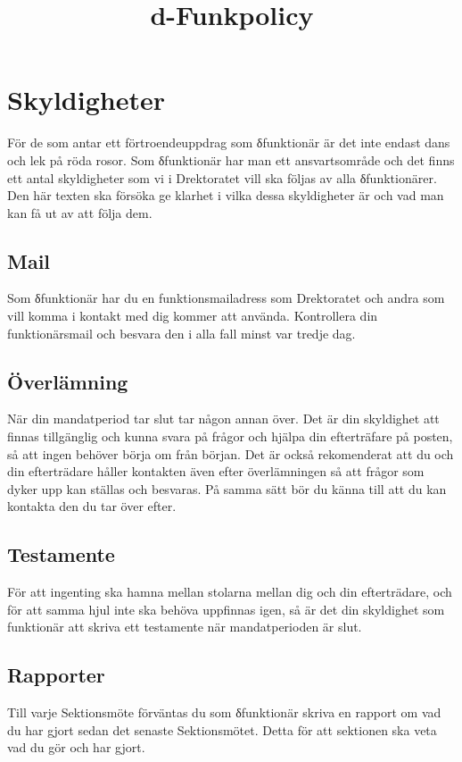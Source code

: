 \documentclass{dgovdoc}
\title{d-Funkpolicy}
\begin{document}
\maketitle

\section*{Skyldigheter}
För de som antar ett förtroendeuppdrag som δfunktionär är det inte endast dans och lek på röda rosor. Som δfunktionär har man ett ansvartsområde och det finns ett antal skyldigheter som vi i D­rektoratet vill ska följas av alla δfunktionärer. Den här texten ska försöka ge klarhet i vilka dessa skyldigheter är och vad man kan få ut av att följa dem. 

\subsection*{Mail}
Som δfunktionär har du en funktionsmailadress som D­rektoratet och andra som vill komma i kontakt med dig kommer att använda. Kontrollera din funktionärsmail och besvara den i alla fall minst var tredje dag. 

\subsection*{Överlämning}
När din mandatperiod tar slut tar någon annan över. Det är din skyldighet att finnas tillgänglig och kunna svara på frågor och hjälpa din efterträfare på posten, så att ingen behöver börja om från början. Det är också rekomenderat att du och din efterträdare håller kontakten även efter överlämningen så att frågor som dyker upp kan ställas och besvaras. På samma sätt bör du känna till att du kan kontakta den du tar över efter. 

\subsection*{Testamente}
För att ingenting ska hamna mellan stolarna mellan dig och din efterträdare, och för att samma hjul inte ska behöva uppfinnas igen, så är det din skyldighet som funktionär att skriva ett testamente när mandatperioden är slut.  

\subsection*{Rapporter}
Till varje Sektionsmöte förväntas du som δfunktionär skriva en rapport om vad du har gjort sedan det senaste Sektionsmötet. Detta för att sektionen ska veta vad du gör och har gjort. 
\end{document}

